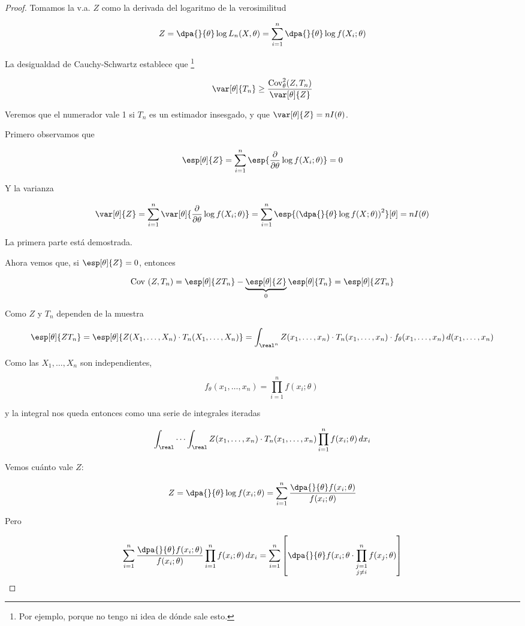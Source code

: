 \documentclass{apuntes}
\begin{document}
\begin{proof} Tomamos la v.a. $Z$ como la derivada del logaritmo de la verosimilitud

\[ Z = \dpa{}{\theta}\log L_n (X,\theta) = \sum_{i=1}^n \dpa{}{\theta} \log f(X_i;\theta) \]

La desigualdad de Cauchy-Schwartz establece que \footnote{Por ejemplo, porque no tengo ni idea de dónde sale esto.}

\[ \var[\theta]{T_n} \geq \frac{\text{Cov}_\theta^2 (Z,T_n)}{\var[\theta]{Z}} \]

Veremos que el numerador vale 1 si $T_n$ es un estimador insesgado, y que $\var[\theta]{Z} = n I(\theta)$.

Primero observamos que

\[ \esp[\theta]{Z} = \sum_{i=1}^n \esp{\frac{\partial}{\partial\theta} \log f(X_i;\theta)} = 0 \]

Y la varianza

\[ \var[\theta]{Z} = \sum_{i=1}^n \var[\theta]{\frac{\partial}{\partial\theta} \log f(X_i;\theta)} = \sum_{i=1}^n \esp{\left(\dpa{}{\theta} \log f(X;\theta)\right)^2}[\theta] = n I(\theta) \]

La primera parte está demostrada.

Ahora vemos que, si $\esp[\theta]{Z} = 0$, entonces

\[ \text{Cov }(Z,T_n) = \esp[\theta]{ZT_n} - \underbrace{\esp[\theta]{Z}}_0 \esp[\theta]{T_n} = \esp[\theta]{ZT_n}  \]

Como $Z$ y $T_n$ dependen de la muestra

\[ \esp[\theta]{ZT_n} = \esp[\theta] {Z(X_1,\dotsc,X_n) \cdot T_n(X_1,\dotsc,X_n)}= \int_{\real^n} Z(x_1,\dotsc,x_n) \cdot T_n(x_1,\dotsc,x_n) \cdot f_\theta(x_1,\dotsc,x_n)\,d(x_1, \dotsc, x_n) \]

Como las $X_1,\dotsc,X_n$ son independientes,

\[ f_\theta(x_1,\dotsc,x_n) = \prod_{i=1}^nf(x_i;\theta)\ \]

y la integral nos queda entonces como una serie de integrales iteradas

\[ \int_\real \dotsb \int_\real Z(x_1,\dotsc,x_n) \cdot T_n(x_1,\dotsc,x_n)  \prod_{i=1}^nf(x_i;\theta)\,dx_i \]

Vemos cuánto vale $Z$:

\[ Z = \dpa{}{\theta}\log f(x_i;\theta) = \sum_{i=1}^n \frac{\dpa{}{\theta}f(x_i;\theta)}{f(x_i;\theta)} \]

Pero

\[ \sum_{i=1}^n \frac{\dpa{}{\theta}f(x_i;\theta)}{f(x_i;\theta)}  \prod_{i=1}^nf(x_i;\theta)\,dx_i  = \sum_{i=1}^n\left[ \dpa{}{\theta}f(x_i;\theta \cdot \prod_{\substack{j=1\\j\neq i}}^n f(x_j;\theta) \right] \]


\end{proof}
\end{document}
